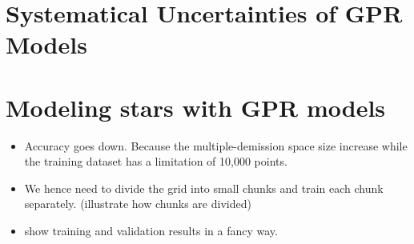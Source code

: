 \section{Systematical Uncertainties of GPR Models}\label{sec:sys}

\section{Modeling stars with GPR models}




\begin{itemize}
\item Accuracy goes down. Because the multiple-demission space size increase while the training dataset has a limitation of 10,000 points.  
\item We hence need to divide the grid into small chunks and train each chunk separately.  (illustrate how chunks are divided)
\item  show training and validation results in a fancy way. 
\end{itemize}









